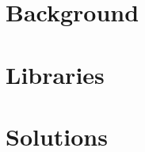 \documentclass[12pt,a4paper,oneside]{book}
\begin{document}


\tableofcontents

\part{Background}


\part{Libraries}


\part{Solutions}


\listoftodos
\end{document}

